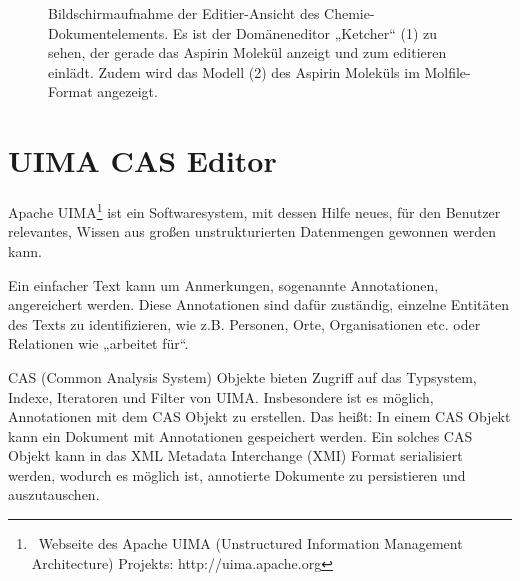 \begin{figure}[h!]
\centering
\advance\leftskip-2.5cm
\caption[Bildschirmaufnahme Chemie-Dokumentelement]{ Bildschirmaufnahme der Editier-Ansicht des Chemie-Dokumentelements. Es ist der Domäneneditor „Ketcher“ (1) zu sehen, der gerade das Aspirin Molekül anzeigt und zum editieren einlädt. Zudem wird das Modell (2) des Aspirin Moleküls im Molfile-Format angezeigt. }\label{chemieeditieren}
\end{figure}
 
\section{UIMA CAS Editor}\label{uima-cas-kapitel}
 
Apache UIMA\footnote{~Webseite des Apache UIMA (Unstructured Information Management Architecture) Projekts: http://uima.apache.org } ist ein Softwaresystem, mit dessen Hilfe neues, für den Benutzer relevantes, Wissen aus großen unstrukturierten Datenmengen gewonnen werden kann.

 
Ein einfacher Text kann um Anmerkungen, sogenannte Annotationen, angereichert werden. Diese Annotationen sind dafür zuständig, einzelne Entitäten des Texts zu identifizieren, wie z.B. Personen, Orte, Organisationen etc. oder Relationen wie „arbeitet für“.

 
CAS (Common Analysis System) Objekte bieten Zugriff auf das Typsystem, Indexe, Iteratoren und Filter von UIMA. Insbesondere ist es möglich, Annotationen mit dem CAS Objekt zu erstellen. Das heißt: In einem CAS Objekt kann ein Dokument mit Annotationen gespeichert werden. Ein solches CAS Objekt kann in das XML Metadata Interchange (XMI) Format serialisiert werden, wodurch es möglich ist, annotierte Dokumente zu persistieren und auszutauschen.

